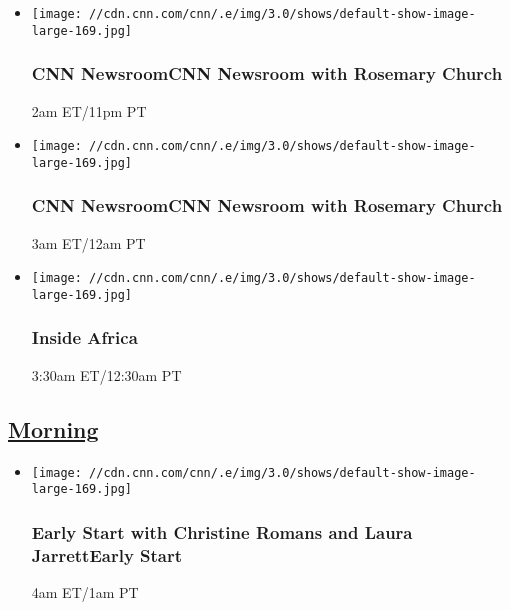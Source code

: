 \begin{itemize}
\item
  \texttt{[image: //cdn.cnn.com/cnn/.e/img/3.0/shows/default-show-image-large-169.jpg]}

  \hypertarget{cnn-newsroomcnn-newsroom-with-rosemary-church--2}{%
  \subsubsection{CNN NewsroomCNN Newsroom with Rosemary Church
  }\label{cnn-newsroomcnn-newsroom-with-rosemary-church--2}}

  2am ET/11pm PT
\end{itemize}

\begin{itemize}
\item
  \texttt{[image: //cdn.cnn.com/cnn/.e/img/3.0/shows/default-show-image-large-169.jpg]}

  \hypertarget{cnn-newsroomcnn-newsroom-with-rosemary-church--3}{%
  \subsubsection{CNN NewsroomCNN Newsroom with Rosemary Church
  }\label{cnn-newsroomcnn-newsroom-with-rosemary-church--3}}

  3am ET/12am PT
\end{itemize}

\begin{itemize}
\item
  \texttt{[image: //cdn.cnn.com/cnn/.e/img/3.0/shows/default-show-image-large-169.jpg]}

  \hypertarget{inside-africa-6}{%
  \subsubsection{Inside Africa}\label{inside-africa-6}}

  3:30am ET/12:30am PT
\end{itemize}

\hypertarget{morning--3}{%
\subsection{\texorpdfstring{\href{/tv/schedule/cnn/index.html}{Morning}~}{Morning~}}\label{morning--3}}

\begin{itemize}
\item
  \texttt{[image: //cdn.cnn.com/cnn/.e/img/3.0/shows/default-show-image-large-169.jpg]}

  \hypertarget{early-start-with-christine-romans-and-laura-jarrettearly-start--1}{%
  \subsubsection{Early Start with Christine Romans and Laura
  JarrettEarly Start
  }\label{early-start-with-christine-romans-and-laura-jarrettearly-start--1}}

  4am ET/1am PT
\end{itemize}

